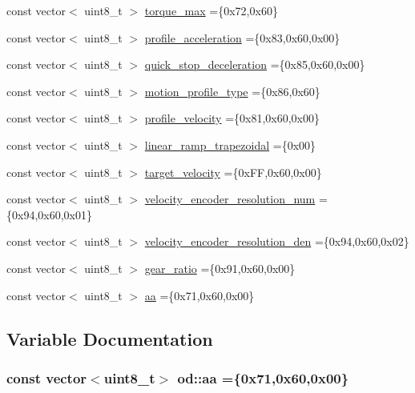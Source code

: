 \begin{DoxyCompactItemize}
\item 
const vector$<$ uint8\+\_\+t $>$ \hyperlink{namespaceod_afe81091f209f3c5eaf8f720e730900fa}{torque\+\_\+max} =\{0x72,0x60\}
\item 
const vector$<$ uint8\+\_\+t $>$ \hyperlink{namespaceod_aced8c17d62c0e774949057de0a99f402}{profile\+\_\+acceleration} =\{0x83,0x60,0x00\}
\item 
const vector$<$ uint8\+\_\+t $>$ \hyperlink{namespaceod_a57361a1a6b60fd8b93c2828fd7f5429f}{quick\+\_\+stop\+\_\+deceleration} =\{0x85,0x60,0x00\}
\item 
const vector$<$ uint8\+\_\+t $>$ \hyperlink{namespaceod_a5256e8439c66da9ab7ad06fa5f72ec1a}{motion\+\_\+profile\+\_\+type} =\{0x86,0x60\}
\item 
const vector$<$ uint8\+\_\+t $>$ \hyperlink{namespaceod_a47b7c8f6797cc134be5ee1d78d83ee50}{profile\+\_\+velocity} =\{0x81,0x60,0x00\}
\item 
const vector$<$ uint8\+\_\+t $>$ \hyperlink{namespaceod_a8d1e6a3e8180e5d64d68588ee182721c}{linear\+\_\+ramp\+\_\+trapezoidal} =\{0x00\}
\item 
const vector$<$ uint8\+\_\+t $>$ \hyperlink{namespaceod_a758ce0003cc482e5464959ed79c808e2}{target\+\_\+velocity} =\{0x\+F\+F,0x60,0x00\}
\item 
const vector$<$ uint8\+\_\+t $>$ \hyperlink{namespaceod_ace9cc22d0ccd7e2ac1b14fb14151ed73}{velocity\+\_\+encoder\+\_\+resolution\+\_\+num} =\{0x94,0x60,0x01\}
\item 
const vector$<$ uint8\+\_\+t $>$ \hyperlink{namespaceod_a2b157384b9a0fb00e80e99438f24f5de}{velocity\+\_\+encoder\+\_\+resolution\+\_\+den} =\{0x94,0x60,0x02\}
\item 
const vector$<$ uint8\+\_\+t $>$ \hyperlink{namespaceod_af615192e30bab04a02f1aa4c21a48642}{gear\+\_\+ratio} =\{0x91,0x60,0x00\}
\item 
const vector$<$ uint8\+\_\+t $>$ \hyperlink{namespaceod_a58009f80110aa4aff7a7ccd58037c27b}{aa} =\{0x71,0x60,0x00\}
\end{DoxyCompactItemize}


\subsection{Variable Documentation}
\subsubsection[{\texorpdfstring{aa}{aa}}]{\setlength{\rightskip}{0pt plus 5cm}const vector$<$uint8\+\_\+t$>$ od\+::aa =\{0x71,0x60,0x00\}}\hypertarget{namespaceod_a58009f80110aa4aff7a7ccd58037c27b}{}\label{namespaceod_a58009f80110aa4aff7a7ccd58037c27b}
